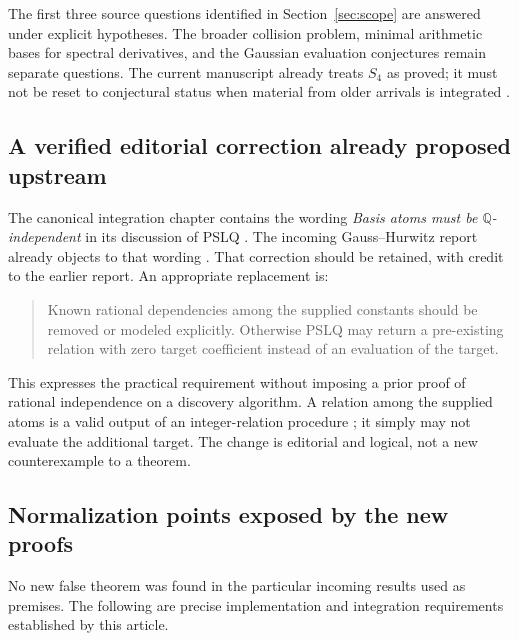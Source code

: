 \documentclass[11pt,a4paper]{article}
\numberwithin{equation}{section}
\theoremstyle{definition}
\theoremstyle{remark}
\newcommand{\Q}{\mathbb Q}
\begin{document}
The first three source questions identified in Section~\ref{sec:scope}
are answered under explicit hypotheses. The broader collision problem,
minimal arithmetic bases for spectral derivatives, and the Gaussian
evaluation conjectures remain separate questions. The current manuscript
already treats $S_4$ as proved; it must not be reset to conjectural status
when material from older arrivals is integrated \cite{repo}.

\subsection{A verified editorial correction already proposed upstream}
The canonical integration chapter contains the wording
\emph{Basis atoms must be $\Q$-independent} in its discussion of PSLQ
\cite[chapters/07-integration.tex]{repo}. The incoming Gauss--Hurwitz
report already objects to that wording \cite[Section 8]{incoming-gh}.
That correction should be retained, with credit to the earlier report.
An appropriate replacement is:
\begin{quote}
Known rational dependencies among the supplied constants should be
removed or modeled explicitly. Otherwise PSLQ may return a pre-existing
relation with zero target coefficient instead of an evaluation of the
target.
\end{quote}
This expresses the practical requirement without imposing a prior proof
of rational independence on a discovery algorithm. A relation among
the supplied atoms is a valid output of an integer-relation procedure
\cite{pslq};
it simply may not evaluate the additional target. The change is
editorial and logical, not a new counterexample to a theorem.

\subsection{Normalization points exposed by the new proofs}
No new false theorem was found in the particular incoming results used
as premises. The following are precise implementation and integration
requirements established by this article.
\end{document}
